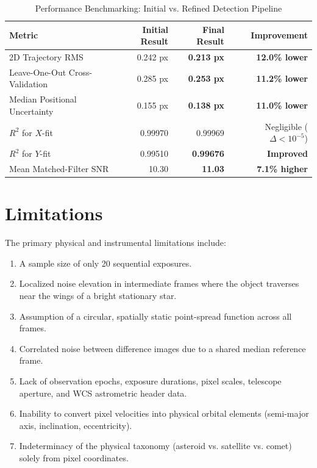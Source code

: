 \documentclass[11pt,a4paper]{article}
\begin{document}
\begin{table}[htbp]
\centering
\caption{Performance Benchmarking: Initial vs. Refined Detection Pipeline}
\label{tab:pipeline_comparison}
\begin{tabular}{lrrr}
\toprule
\textbf{Metric} & \textbf{Initial Result} & \textbf{Final Result} & \textbf{Improvement} \\
\midrule
2D Trajectory RMS               & 0.242 px  & \textbf{0.213 px}  & \textbf{12.0\% lower} \\
Leave-One-Out Cross-Validation  & 0.285 px  & \textbf{0.253 px}  & \textbf{11.2\% lower} \\
Median Positional Uncertainty   & 0.155 px  & \textbf{0.138 px}  & \textbf{11.0\% lower} \\
$R^2$ for $X$-fit               & 0.99970   & 0.99969            & Negligible ($\Delta < 10^{-5}$) \\
$R^2$ for $Y$-fit               & 0.99510   & \textbf{0.99676}   & \textbf{Improved} \\
Mean Matched-Filter SNR         & 10.30     & \textbf{11.03}     & \textbf{7.1\% higher} \\
\bottomrule
\end{tabular}
\end{table}

\section{Limitations}

The primary physical and instrumental limitations include:
\begin{enumerate}[noitemsep]
    \item A sample size of only 20 sequential exposures.
    \item Localized noise elevation in intermediate frames where the object traverses near the wings of a bright stationary star.
    \item Assumption of a circular, spatially static point-spread function across all frames.
    \item Correlated noise between difference images due to a shared median reference frame.
    \item Lack of observation epochs, exposure durations, pixel scales, telescope aperture, and WCS astrometric header data.
    \item Inability to convert pixel velocities into physical orbital elements (semi-major axis, inclination, eccentricity).
    \item Indeterminacy of the physical taxonomy (asteroid vs. satellite vs. comet) solely from pixel coordinates.
\end{enumerate}
\end{document}
